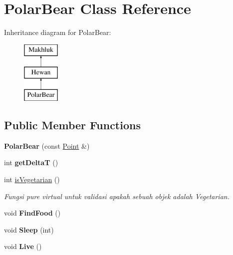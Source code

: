 \hypertarget{class_polar_bear}{}\section{Polar\+Bear Class Reference}
\label{class_polar_bear}
Inheritance diagram for Polar\+Bear\+:\begin{figure}[H]
\begin{center}
\leavevmode
\includegraphics[height=3.000000cm]{class_polar_bear}
\end{center}
\end{figure}
\subsection*{Public Member Functions}
\begin{DoxyCompactItemize}
\item 
{\bfseries Polar\+Bear} (const \hyperlink{class_point}{Point} \&)\hypertarget{class_polar_bear_ad6a4789bb79ea33f3f97e9e5e1b05810}{}\label{class_polar_bear_ad6a4789bb79ea33f3f97e9e5e1b05810}

\item 
int {\bfseries get\+DeltaT} ()\hypertarget{class_polar_bear_a636383dd8f5c357f205642a8b0354a55}{}\label{class_polar_bear_a636383dd8f5c357f205642a8b0354a55}

\item 
int \hyperlink{class_polar_bear_a528b34c3db1dee2cd5c06f6b6d221a14}{is\+Vegetarian} ()
\begin{DoxyCompactList}\small\item\em Fungsi pure virtual untuk validasi apakah sebuah objek adalah Vegetarian. \end{DoxyCompactList}\item 
void {\bfseries Find\+Food} ()\hypertarget{class_polar_bear_aefe882438632da90002566c70caddd38}{}\label{class_polar_bear_aefe882438632da90002566c70caddd38}

\item 
void {\bfseries Sleep} (int)\hypertarget{class_polar_bear_aac818d4540c98d5668cf2c665dfde46f}{}\label{class_polar_bear_aac818d4540c98d5668cf2c665dfde46f}

\item 
void {\bfseries Live} ()\hypertarget{class_polar_bear_aecb4f132a925275d4e730b58fc79158b}{}\label{class_polar_bear_aecb4f132a925275d4e730b58fc79158b}

\end{DoxyCompactItemize}
